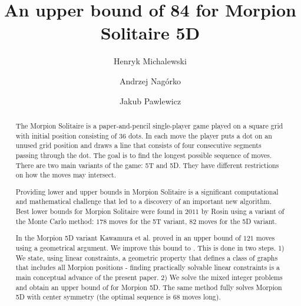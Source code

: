 \documentclass[a4paper,UKenglish]{lipics}
\title{{An upper bound of 84 for Morpion Solitaire 5D}}%
\author[1]{Henryk Michalewski}
\author[1]{Andrzej Nagórko}
\author[1]{Jakub Pawlewicz}
\affil[1]{Department of Mathematics, Informatics and Mechanics\\ University of Warsaw\\ \{H.Michalewski,A.Nagorko,J.Pawlewicz\}@mimuw.edu.pl} %
\begin{document}
\maketitle

\begin{abstract} 
The Morpion Solitaire is a paper-and-pencil single-player game played on a square grid with initial position consisting of $36$ dots.
In each move the player puts a dot on an unused grid position and draws a line that 
  consists of four consecutive segments passing through the dot.
 The goal is to find the longest possible sequence of moves.
There are two main variants of the game: 5T and 5D. 
They have different restrictions on how the moves may intersect.

Providing lower and upper bounds in Morpion Solitaire is a significant computational and mathematical challenge
  that led to a discovery of an important new algorithm.
 Best lower bounds for Morpion Solitaire were found in $2011$ by Rosin \cite{rosin} using a variant of the Monte Carlo method: 
 $178$ moves for the 5T variant, $82$ moves for the 5D variant.
 

In the Morpion 5D variant 
Kawamura et al. proved in \cite{japonczycy} an upper bound of $121$ moves using a geometrical argument. 
We improve this bound to \therecord. 
This is done in two steps.
1) We state, using linear constraints, a geometric property that defines a class of graphs that includes all Morpion  positions - finding practically solvable linear constraints is a main conceptual advance of the present paper.
2) We solve the mixed integer problems and obtain 
an upper bound of \therecord for Morpion 5D. The same method fully solves Morpion 5D with center symmetry (the optimal sequence is $68$ moves long). %
\end{abstract}


  



  






\printbibliography 

%
%
    
\end{document}
